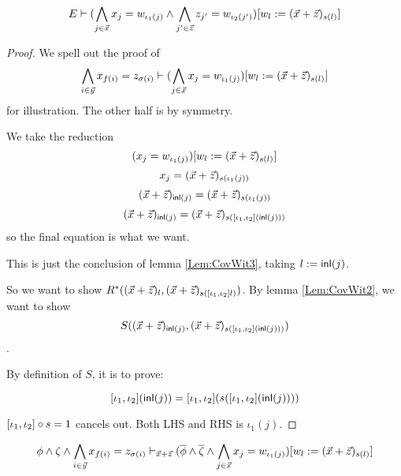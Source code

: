 \begin{lemma}\label{Lem:CovWit4}
  \begin{equation*}
    E \vdash (\bigwedge_{j\in\vec{x}}x_j = w_{\iota_1(j)}\land \bigwedge_{j'\in\vec{z}}z_{j'}= w_{\iota_2(j')}) [w_l:=(\vec{x}+\vec{z})_{s(l)}]
  \end{equation*}
\end{lemma}
\begin{proof}
  We spell out the proof of 
  \begin{equation*}
    \bigwedge_{i\in \vec{y}} x_{f(i)} = z_{\sigma(i)} \vdash 
     (\bigwedge_{j\in\vec{x}}x_j = w_{\iota_1(j)}) [w_l:=(\vec{x}+\vec{z})_{s(l)}] 
   \end{equation*}
   for illustration. The other half is by symmetry.

  We take the reduction
\[(x_j = w_{\iota_1(j)}) [w_l:=(\vec{x}+\vec{z})_{s(l)}]\]
\[x_j = (\vec{x}+\vec{z})_{s(\iota_1(j))}\]
\[(\vec{x}+\vec{z})_{\mathsf{inl}(j)} = (\vec{x}+\vec{z})_{s(\iota_1(j))}\]
\[(\vec{x}+\vec{z})_{\mathsf{inl}(j)} = (\vec{x}+\vec{z})_{s([\iota_1,\iota_2] (\mathsf{inl}(j)))}\]
so the final equation is what we want.

This is just the conclusion of lemma \ref{Lem:CovWit3}, taking $l := \mathsf{inl}(j)$.

So we want to show $R^*((\vec{x}+\vec{z})_l,(\vec{x}+\vec{z})_{s([\iota_1,\iota_2] l)})$. By lemma \ref{Lem:CovWit2}, we want to show \[S((\vec{x}+\vec{z})_{\mathsf{inl}(j)},(\vec{x}+\vec{z})_{s([\iota_1,\iota_2] (\mathsf{inl}(j)))})\].

By definition of $S$, it is to prove:

\[[\iota_1,\iota_2] (\mathsf{inl}(j)) = [\iota_1,\iota_2] (s([\iota_1,\iota_2] (\mathsf{inl}(j)))) \]

$[\iota_1,\iota_2]\circ s = 1$ cancels out. Both LHS and RHS is $\iota_1(j)$.

\end{proof}



  
\begin{lemma}\label{Lem:Witness}
  \begin{equation*}
    \phi\land \zeta\land \bigwedge_{i\in \vec{y}} x_{f(i)} = z_{\sigma(i)}\vdash_{\vec{x} + \vec{z}} (\overline{\phi}\land \overline{\zeta}\land\bigwedge_{j\in\vec{x}} x_j = w_{\iota_1(j)})[w_l:=(\vec{x}+\vec{z})_{s(l)}] 
  \end{equation*}
\end{lemma}

